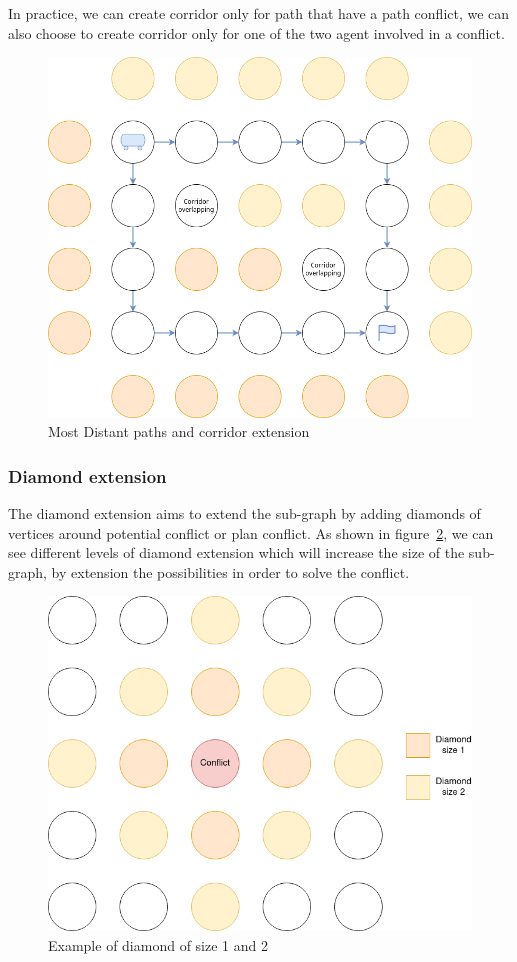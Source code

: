 In practice, we can create corridor only for path that have a path conflict, we can also choose to create corridor only for one of the two agent involved in a conflict.


\begin{figure}[H]
  \centering
  \caption{Most Distant paths and corridor extension}\label{img:case_corridor}
  \includegraphics[width=\widthimg]{img/case_corridor.drawio.png}
\end{figure}


\subsubsection{Diamond extension}

The diamond extension aims to extend the sub-graph by adding diamonds of vertices around potential conflict or plan conflict. As shown in figure~\ref{img:diamond}, we can see different levels of diamond extension which will increase the size of the sub-graph, by extension the possibilities in order to solve the conflict.
\begin{figure}[H]
  \centering
  \caption{Example of diamond of size 1 and 2}\label{img:diamond}
  \includegraphics[width=\widthimg]{img/diamond.drawio.png}
\end{figure}

